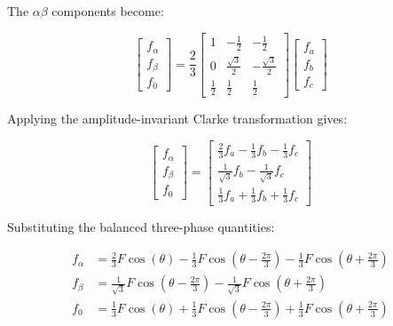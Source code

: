 \documentclass{article}
\begin{document}
The $\alpha\beta$ components become:

\begin{equation}
    \begin{bmatrix}
        f_{\alpha} \\
        f_{\beta} \\
        f_0
    \end{bmatrix}
    =
    \frac{2}{3}
    \begin{bmatrix}
        1 & -\frac{1}{2} & -\frac{1}{2} \\[2mm]
        0 & \frac{\sqrt{3}}{2} & -\frac{\sqrt{3}}{2} \\[2mm]
        \frac{1}{2} & \frac{1}{2} & \frac{1}{2}
    \end{bmatrix}
    \begin{bmatrix}
        f_a \\
        f_b \\
        f_c
    \end{bmatrix}
\end{equation}

Applying the amplitude-invariant Clarke transformation gives:

\begin{equation}
    \begin{bmatrix}
        f_{\alpha} \\
        f_{\beta} \\
        f_0
    \end{bmatrix}
    =
    \begin{bmatrix}
        \frac{2}{3}f_a-\frac{1}{3}f_b-\frac{1}{3}f_c \\
        \frac{1}{\sqrt{3}}f_b-\frac{1}{\sqrt{3}}f_c \\
        \frac{1}{3}f_a+\frac{1}{3}f_b+\frac{1}{3}f_c
    \end{bmatrix}
\end{equation}

Substituting the balanced three-phase quantities:

\begin{align}
    f_{\alpha}
    &=
    \frac{2}{3}F\cos(\theta)
    -\frac{1}{3}F\cos\left(\theta-\frac{2\pi}{3}\right)
    -\frac{1}{3}F\cos\left(\theta+\frac{2\pi}{3}\right) \\[2mm]
    f_{\beta}
    &=
    \frac{1}{\sqrt{3}}F\cos\left(\theta-\frac{2\pi}{3}\right)
    -\frac{1}{\sqrt{3}}F\cos\left(\theta+\frac{2\pi}{3}\right) \\[2mm]
    f_0
    &=
    \frac{1}{3}F\cos(\theta)
    +\frac{1}{3}F\cos\left(\theta-\frac{2\pi}{3}\right)
    +\frac{1}{3}F\cos\left(\theta+\frac{2\pi}{3}\right)
\end{align}
\end{document}
